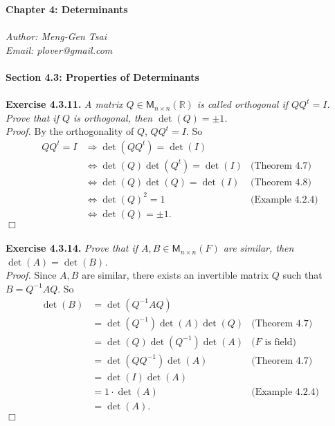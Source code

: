 \documentclass{article}
\begin{document}
\textbf{\Large Chapter 4: Determinants} \\\\



\emph{Author: Meng-Gen Tsai} \\
\emph{Email: plover@gmail.com} \\\\



\textbf{\large Section 4.3: Properties of Determinants} \\\\



\textbf{Exercise 4.3.11.}
\emph{A matrix $Q \in \mathsf{M}_{n \times n}(\mathbb{R})$
is called orthogonal if $QQ^t = I$.
Prove that if $Q$ is orthogonal, then $\det(Q) = \pm 1$.} \\

\emph{Proof.}
By the orthogonality of $Q$, $QQ^t = I$. So
\begin{align*}
QQ^t = I
&\Longrightarrow
\det(QQ^t) = \det(I) \\
&\Longleftrightarrow
\det(Q)\det(Q^t) = \det(I)
  &\text{(Theorem 4.7)} \\
&\Longleftrightarrow
\det(Q)\det(Q) = \det(I)
  &\text{(Theorem 4.8)} \\
&\Longleftrightarrow
\det(Q)^2 = 1
  &\text{(Example 4.2.4)} \\
&\Longleftrightarrow
\det(Q) = \pm 1.
\end{align*}
$\Box$ \\\\



\textbf{Exercise 4.3.14.}
\emph{Prove that if $A, B \in \mathsf{M}_{n \times n}(F)$
are similar, then $\det(A) = \det(B)$.} \\

\emph{Proof.}
Since $A, B$ are similar, there exists an invertible matrix $Q$
such that $B = Q^{-1}AQ$.
So
\begin{align*}
\det(B)
&= \det(Q^{-1}AQ) \\
&= \det(Q^{-1})\det(A)\det(Q)
  &\text{(Theorem 4.7)} \\
&= \det(Q)\det(Q^{-1})\det(A)
  &\text{($F$ is field)} \\
&= \det(Q Q^{-1})\det(A)
  &\text{(Theorem 4.7)} \\
&= \det(I)\det(A) \\
&= 1 \cdot \det(A)
  &\text{(Example 4.2.4)} \\
&= \det(A).
\end{align*}
$\Box$ \\\\
\end{document}

